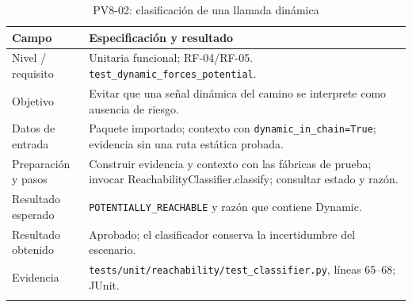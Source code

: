 \begin{table}[H]
\centering\small{}
\caption{PV8-02: clasificación de una llamada dinámica}
\begin{tabularx}{\textwidth}{P{3.5cm}Y}
\toprule
\textbf{Campo} & \textbf{Especificación y resultado} \\
\midrule
Nivel / requisito & Unitaria funcional; RF-04/RF-05. \texttt{test\_\allowbreak dynamic\_\allowbreak forces\_\allowbreak potential}. \\
\addlinespace
Objetivo & Evitar que una señal dinámica del camino se interprete como ausencia de riesgo. \\
\addlinespace
Datos de entrada & Paquete importado; contexto con \texttt{dynamic\_\allowbreak in\_\allowbreak chain=True}; evidencia sin una ruta estática probada. \\
\addlinespace
Preparación y pasos & Construir evidencia y contexto con las fábricas de prueba; invocar ReachabilityClassifier.classify; consultar estado y razón. \\
\addlinespace
Resultado esperado & \texttt{POTENTIALLY\_\allowbreak REACHABLE} y razón que contiene Dynamic. \\
\addlinespace
Resultado obtenido & Aprobado; el clasificador conserva la incertidumbre del escenario. \\
\addlinespace
Evidencia & \texttt{tests/\allowbreak unit/\allowbreak reachability/\allowbreak test\_\allowbreak classifier.\allowbreak py}, líneas 65--68; JUnit. \\
\addlinespace
\bottomrule
\end{tabularx}
\end{table}
